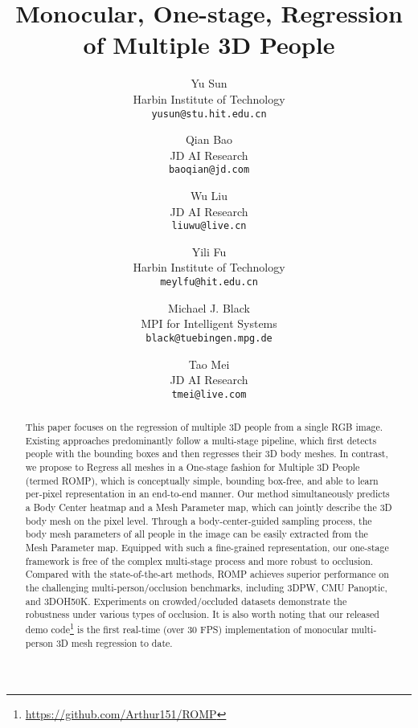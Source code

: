 \documentclass[10pt,twocolumn,letterpaper]{article}
\begin{document}
\title{Monocular, One-stage, Regression of Multiple 3D People}
\predate{}
\author{Yu Sun\\
\normalsize Harbin Institute of Technology\\
{\tt\small yusun@stu.hit.edu.cn}
\and
Qian Bao\\
\normalsize JD AI Research\\
{\tt\small baoqian@jd.com}
\and
Wu Liu\\
\normalsize JD AI Research\\
{\tt\small liuwu@live.cn}
\and
Yili Fu\\
\normalsize Harbin Institute of Technology\\
{\tt\small meylfu@hit.edu.cn}
\and
Michael J. Black\\
\normalsize MPI for Intelligent Systems\\
{\tt\small black@tuebingen.mpg.de}
\and
Tao Mei\\
\normalsize JD AI Research\\
{\tt\small tmei@live.com}
}
\posttitle{\par\end{center}}
\postdate{}
\date{}
\maketitle 
\ificcvfinal\thispagestyle{empty}\fi

\begin{abstract}
This paper focuses on the regression of multiple 3D people from a single RGB image.
Existing approaches predominantly follow a multi-stage pipeline, which first detects people with the bounding boxes and then regresses their 3D body meshes. 
In contrast, we propose to Regress all meshes in a One-stage fashion for Multiple 3D People (termed ROMP), which is conceptually simple, bounding box-free, and able to learn per-pixel representation in an end-to-end manner.
Our method simultaneously predicts a Body Center heatmap and a Mesh Parameter map, which can jointly describe the 3D body mesh on the pixel level.
Through a body-center-guided sampling process, the body mesh parameters of all people in the image can be easily extracted from the Mesh Parameter map.
Equipped with such a fine-grained representation, our one-stage framework is free of the complex multi-stage process and more robust to occlusion.
Compared with the state-of-the-art methods, ROMP achieves superior performance on the challenging multi-person/occlusion benchmarks, including 3DPW, CMU Panoptic, and 3DOH50K. Experiments on crowded/occluded datasets demonstrate the robustness under various types of occlusion. 
It is also worth noting that our released demo code\footnote{\href{https://github.com/Arthur151/ROMP}{https://github.com/Arthur151/ROMP}} 
is the first real-time (over 30 FPS) implementation of monocular multi-person 3D mesh regression to date.


\end{abstract}
\vspace{-3mm}
\end{document}
